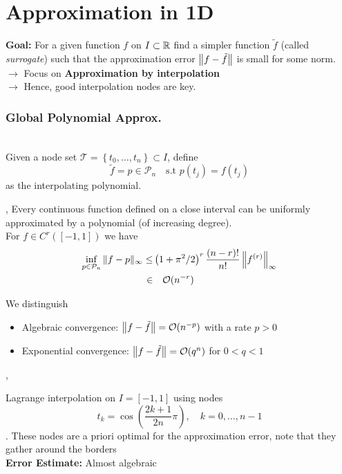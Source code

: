 \columnbreak
\part{Approximation in 1D}
\setcounter{section}{0}

\textbf{Goal:} For a given function $f$ on $I \subset \mathbb{R}$ find a simpler function $\tilde{f}$ (called \textit{surrogate}) such that the approximation error $\left\lVert f-\tilde{f} \right\rVert$ is small for some norm.\\

$\longrightarrow$ Focus on \textbf{Approximation by interpolation}\\
$\longrightarrow$ Hence, good interpolation nodes are key.

\section{Global Polynomial Approx.}

 \\
Given a node set $\mathcal{T}=\left\{t_{0}, \ldots, t_{n}\right\} \subset I$, define 
$$\tilde{f} = p \in \mathcal{P}_n \quad \text{s.t } p(t_j)=f(t_j)$$ as the interpolating polynomial.

\sep
\Theorem[Weierstrass] Every continuous function defined on a close interval can be uniformly approximated by a polynomial (of increasing degree). \\

 For $f \in C^r([-1,1])$ we have
\begin{align*}
	\inf _{p \in \mathcal{P}_{n}}\|f-p\|_{\infty} \leq &  \left(1+\pi^{2} / 2\right)^{r} \frac{(n-r) !}{n !}\left\|f^{(r)}\right\|_{\infty} \\
	\in & \quad \mathcal{O}(n^{-r})
\end{align*}

 We distinguish
\begin{itemize}
	\item Algebraic convergence: $\left\lVert f-\tilde{f} \right\rVert= \mathcal{O}(n^{-p})$ with a rate $p>0$
	
	\item Exponential convergence: $\left\lVert f-\tilde{f} \right\rVert= \mathcal{O}(q^{n})$ for $0<q<1$
\end{itemize}
\sep

 Lagrange interpolation on $I=[-1,1]$ using nodes 
$$t_{k}=\cos \left(\frac{2 k+1}{2 n} \pi\right), \quad k=0, \ldots, n-1$$. These nodes are a priori optimal for the approximation error, note that they gather around the borders \\
\textbf{Error Estimate:} Almost algebraic



